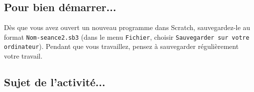 \vspace{12pt}

\subsection{Pour bien démarrer...}

\vspace{10pt}

Dès que vous avez ouvert un nouveau programme dans Scratch, sauvegardez-le au format \texttt{Nom-seance2.sb3} (dans le menu \texttt{Fichier}, choisir \texttt{Sauvegarder sur votre ordinateur}). Pendant que vous travaillez, pensez à sauvegarder régulièrement votre travail.   


\subsection{Sujet de l'activité...}

\vspace{10pt}

